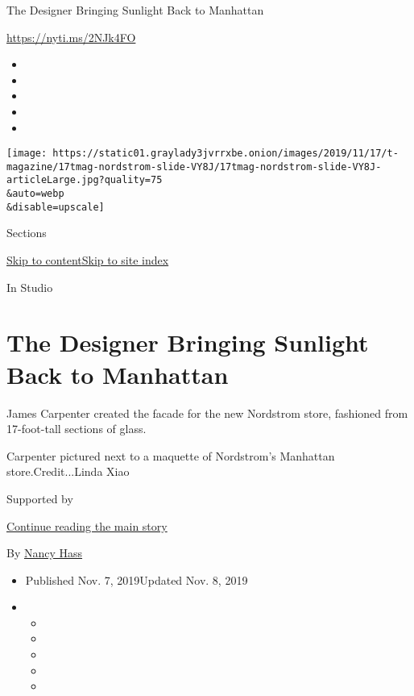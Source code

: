 The Designer Bringing Sunlight Back to Manhattan

\url{https://nyti.ms/2NJk4FO}

\begin{itemize}
\item
\item
\item
\item
\item
\end{itemize}

\texttt{[image: https://static01.graylady3jvrrxbe.onion/images/2019/11/17/t-magazine/17tmag-nordstrom-slide-VY8J/17tmag-nordstrom-slide-VY8J-articleLarge.jpg?quality=75\\\&auto=webp\\\&disable=upscale]}

Sections

\protect\hyperlink{site-content}{Skip to
content}\protect\hyperlink{site-index}{Skip to site index}

In Studio

\hypertarget{the-designer-bringing-sunlight-back-to-manhattan}{%
\section{The Designer Bringing Sunlight Back to
Manhattan}\label{the-designer-bringing-sunlight-back-to-manhattan}}

James Carpenter created the facade for the new Nordstrom store,
fashioned from 17-foot-tall sections of glass.

Carpenter pictured next to a maquette of Nordstrom's Manhattan
store.Credit...Linda Xiao

Supported by

\protect\hyperlink{after-sponsor}{Continue reading the main story}

By \href{https://www.nytimes3xbfgragh.onion/by/nancy-hass}{Nancy Hass}

\begin{itemize}
\item
  Published Nov. 7, 2019Updated Nov. 8, 2019
\item
  \begin{itemize}
  \item
  \item
  \item
  \item
  \item
  \end{itemize}
\end{itemize}

